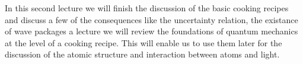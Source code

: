 In this second lecture we will finish the discussion of the basic cooking recipes and discuss a few of the consequences like the uncertainty relation, the existance of wave packages a lecture we will review the foundations of quantum mechanics at the level of a cooking recipe. This will enable us to use them later for the discussion of the atomic structure and interaction between atoms and light.